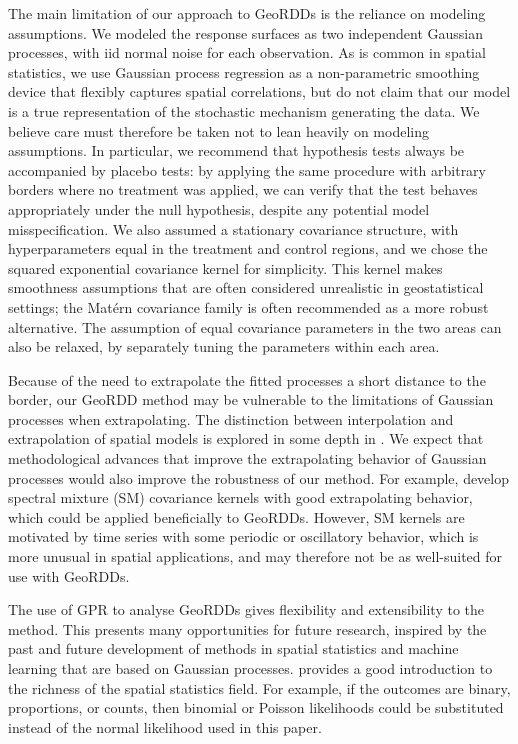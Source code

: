The main limitation of our approach to GeoRDDs is the reliance on modeling assumptions.
We modeled the response surfaces as two independent Gaussian processes, with iid normal noise for each observation.
As is common in spatial statistics, we use Gaussian process regression as a non-parametric smoothing device that flexibly captures spatial correlations, but do not claim that our model is a true representation of the stochastic mechanism generating the data.
We believe care must therefore be taken not to lean heavily on modeling assumptions.
In particular, we recommend that hypothesis tests always be accompanied by placebo tests:
by applying the same procedure with arbitrary borders where no treatment was applied, we can verify that the test behaves appropriately under the null hypothesis, despite any potential model misspecification.
We also assumed a stationary covariance structure, with hyperparameters equal in the treatment and control regions, and we chose the squared exponential covariance kernel for simplicity.
This kernel makes smoothness assumptions that are often considered unrealistic in geostatistical settings; the Mat\'ern covariance family is often recommended as a more robust alternative.
The assumption of equal covariance parameters in the two areas can also be relaxed, by separately tuning the parameters within each area.

Because of the need to extrapolate the fitted processes a short distance to the border, our GeoRDD method may be vulnerable to the limitations of Gaussian processes when extrapolating.
The distinction between interpolation and extrapolation of spatial models is explored in some depth in \cite{stein2012interpolation}.
We expect that methodological advances that improve the extrapolating behavior of Gaussian processes would also improve the robustness of our method.
For example, \cite{wilson2013gaussian} develop spectral mixture (SM) covariance kernels with good extrapolating behavior, which could be applied beneficially to GeoRDDs.
However, SM kernels are motivated by time series with some periodic or oscillatory behavior, which is more unusual in spatial applications, and may therefore not be as well-suited for use with GeoRDDs.

The use of GPR to analyse GeoRDDs gives flexibility and extensibility to the method.
This presents many opportunities for future research, inspired by the past and future development of methods in spatial statistics and machine learning that are based on Gaussian processes.
\cite{banerjee2014hierarchical} provides a good introduction to the richness of the spatial statistics field.
For example, if the outcomes are binary, proportions, or counts, then binomial or Poisson likelihoods could be substituted instead of the normal likelihood used in this paper.

